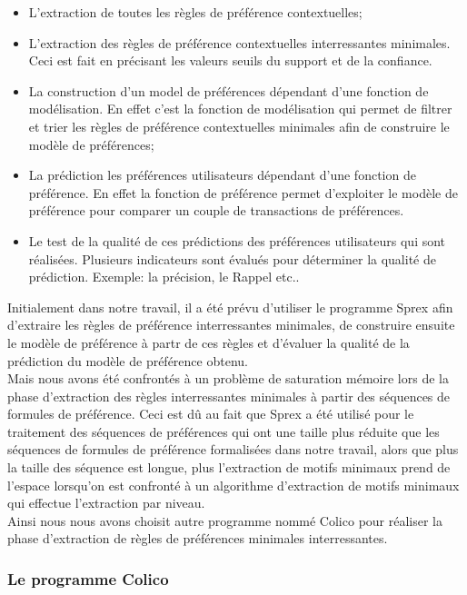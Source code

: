 \documentclass[a4paper,12pt,openany,oneside]{article}
\begin{document}
\begin{itemize}
\item L'extraction de toutes les règles de préférence contextuelles;
\item L'extraction des règles de préférence contextuelles interressantes minimales. Ceci est fait en précisant les valeurs seuils du support et de la confiance.
\item La construction d'un model de préférences dépendant d'une fonction de modélisation. En effet c'est la fonction de modélisation qui permet de filtrer et trier les règles de préférence contextuelles minimales afin de construire le modèle de préférences;
\item La prédiction les préférences utilisateurs dépendant d'une fonction de préférence. En effet la fonction de préférence permet d'exploiter le modèle de préférence pour comparer un couple de transactions de préférences.
\item Le test de la qualité de ces prédictions des préférences utilisateurs qui sont réalisées. Plusieurs indicateurs sont évalués pour déterminer la qualité de prédiction. Exemple: la précision, le Rappel etc..\\
\end{itemize}

Initialement dans notre travail, il a été prévu d'utiliser le programme Sprex afin d'extraire les règles de préférence interressantes minimales, de construire ensuite le modèle de préférence  à partr de ces règles et d'évaluer la qualité de la prédiction du modèle de préférence obtenu. \\
Mais nous avons été confrontés à un problème de saturation mémoire lors de la phase d'extraction des règles interressantes minimales à partir des séquences de formules de préférence. Ceci est dû au fait que Sprex a été utilisé pour le traitement des séquences de préférences qui ont une taille plus réduite que les séquences de formules de préférence formalisées dans notre travail, alors que plus la taille des séquence est longue, plus l'extraction de motifs minimaux prend de l'espace lorsqu'on est confronté à un algorithme d'extraction de motifs minimaux qui effectue l'extraction par niveau.\\
Ainsi nous nous avons choisit autre programme  nommé Colico pour réaliser la phase d'extraction de règles de préférences minimales interressantes. 


\subsubsection{Le programme Colico}
\end{document}
